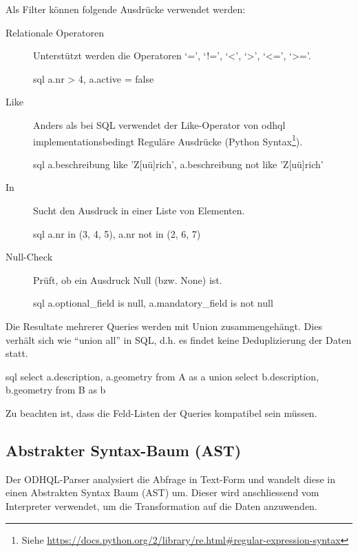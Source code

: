Als Filter können folgende Ausdrücke verwendet werden:
\begin{description}
\item[Relationale Operatoren] Unterstützt werden die Operatoren `=', `!=', `<', `>', `<=', `>='.
\begin{src}{sql}
a.nr > 4, a.active = false
\end{src}
\item[Like] Anders als bei SQL verwendet der Like-Operator von \acs{odhql} implementationsbedingt Reguläre Ausdrücke (Python Syntax\footnote{Siehe \url{https://docs.python.org/2/library/re.html\#regular-expression-syntax}}).
\begin{src}{sql}
a.beschreibung like 'Z[uü]rich', a.beschreibung not like 'Z[uü]rich'
\end{src}
\item[In] Sucht den Ausdruck in einer Liste von Elementen.
\begin{src}{sql}
a.nr in (3, 4, 5), a.nr not in (2, 6, 7)
\end{src}
\item[Null-Check] Prüft, ob ein Ausdruck Null (bzw. None) ist.
\begin{src}{sql}
a.optional_field is null, a.mandatory_field is not null
\end{src}
\end{description}

Die Resultate mehrerer Queries werden mit Union zusammengehängt. Dies verhält sich wie ``union all'' in SQL, d.h. es findet keine Deduplizierung der Daten statt.
\begin{src}{sql}
  select a.description, a.geometry from A as a
   union
  select b.description, b.geometry from B as b
\end{src}
Zu beachten ist, dass die Feld-Listen der Queries kompatibel sein müssen.
\newline

\subsection{Abstrakter Syntax-Baum (AST)}
Der ODHQL-Parser analysiert die Abfrage in Text-Form und wandelt diese in einen Abstrakten Syntax Baum (AST) um. Dieser wird anschliessend vom Interpreter verwendet, um die Transformation auf die Daten anzuwenden.


